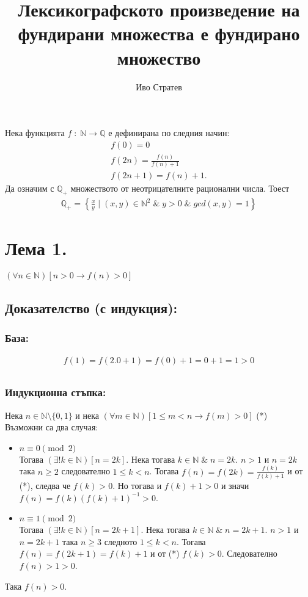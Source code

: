 \documentclass[a4paper, 12pt, oneside]{article}
\title{Лексикографското произведение на фундирани множества е фундирано множество}
\author{Иво Стратев}
\begin{document}
\maketitle
Нека функцията \(f \; : \; \mathbb{N} \to \mathbb{Q}\) е дефинирана по следния начин:
\begin{align*}
f(0) = 0 \\
f(2n) = \displaystyle\frac{f(n)}{f(n) + 1} \\
f(2n + 1) = f(n) + 1.
\end{align*}
Да означим с \(\mathbb{Q}_+\) множеството от неотрицателните рационални числа. Тоест
\begin{align*}
    \mathbb{Q}_+ = \left\{\displaystyle\frac{x}{y} \; \Big| \; (x, y) \in \mathbb{N}^2 \; \& \; y > 0 \; \& \; gcd(x, y) = 1\right\}
\end{align*}
\section*{Лема 1.}
\((\forall n \in \mathbb{N})[n > 0 \longrightarrow f(n) > 0]\)
\subsection*{Доказателство (с индукция):}
\subsubsection*{База:}
\begin{align*}
    f(1) = f(2.0 + 1) = f(0) + 1 = 0 + 1 = 1 > 0 \\
\end{align*}
\subsubsection*{Индукционна стъпка:}
Нека \(n \in \mathbb{N}\setminus\{0, 1\}\) и нека \((\forall m \in \mathbb{N})[1 \leq m < n \longrightarrow f(m) > 0]\) (*) \\
Възможни са два случая:
\begin{itemize}
\item \(n \equiv 0 \pmod{2}\) \\
Тогава \((\exists! k \in \mathbb{N})[n = 2k]\). Нека тогава \(k \in \mathbb{N} \; \& \; n = 2k\).
\(n > 1\) и \(n = 2k\) така \(n \geq 2\) следователно \(1 \leq k < n\). 
Тогава \(f(n) = f(2k) = \displaystyle\frac{f(k)}{f(k) + 1}\) и от (*),
следва че \(f(k) > 0\). Но тогава и \(f(k) + 1 > 0\) и значи \\
\(f(n) = f(k)(f(k) + 1)^{-1} >0\).    
\item \(n \equiv 1 \pmod{2}\) \\
Тогава \((\exists! k \in \mathbb{N})[n = 2k + 1]\). Нека тогава \(k \in \mathbb{N} \; \& \; n = 2k + 1\).
\(n > 1\) и \(n = 2k + 1\) така \(n \geq 3\) следното \(1 \leq k < n\).
Тогава \(f(n) = f(2k + 1) = f(k) + 1\) и от (*) \(f(k) > 0\).
Следователно \(f(n) > 1 > 0\).
\end{itemize}
Така \(f(n) > 0\).
\end{document}
